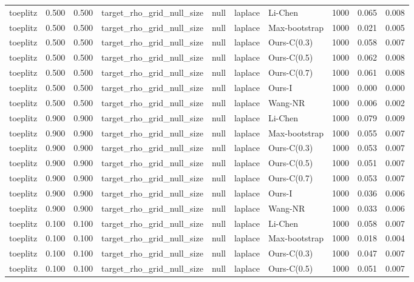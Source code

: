 \begin{tabular}{lrrllllrrr}
toeplitz & 0.500 & 0.500 & target\_rho\_grid\_null\_size & null & laplace & Li-Chen & 1000 & 0.065 & 0.008 \\
toeplitz & 0.500 & 0.500 & target\_rho\_grid\_null\_size & null & laplace & Max-bootstrap & 1000 & 0.021 & 0.005 \\
toeplitz & 0.500 & 0.500 & target\_rho\_grid\_null\_size & null & laplace & Ours-C(0.3) & 1000 & 0.058 & 0.007 \\
toeplitz & 0.500 & 0.500 & target\_rho\_grid\_null\_size & null & laplace & Ours-C(0.5) & 1000 & 0.062 & 0.008 \\
toeplitz & 0.500 & 0.500 & target\_rho\_grid\_null\_size & null & laplace & Ours-C(0.7) & 1000 & 0.061 & 0.008 \\
toeplitz & 0.500 & 0.500 & target\_rho\_grid\_null\_size & null & laplace & Ours-I & 1000 & 0.000 & 0.000 \\
toeplitz & 0.500 & 0.500 & target\_rho\_grid\_null\_size & null & laplace & Wang-NR & 1000 & 0.006 & 0.002 \\
toeplitz & 0.900 & 0.900 & target\_rho\_grid\_null\_size & null & laplace & Li-Chen & 1000 & 0.079 & 0.009 \\
toeplitz & 0.900 & 0.900 & target\_rho\_grid\_null\_size & null & laplace & Max-bootstrap & 1000 & 0.055 & 0.007 \\
toeplitz & 0.900 & 0.900 & target\_rho\_grid\_null\_size & null & laplace & Ours-C(0.3) & 1000 & 0.053 & 0.007 \\
toeplitz & 0.900 & 0.900 & target\_rho\_grid\_null\_size & null & laplace & Ours-C(0.5) & 1000 & 0.051 & 0.007 \\
toeplitz & 0.900 & 0.900 & target\_rho\_grid\_null\_size & null & laplace & Ours-C(0.7) & 1000 & 0.053 & 0.007 \\
toeplitz & 0.900 & 0.900 & target\_rho\_grid\_null\_size & null & laplace & Ours-I & 1000 & 0.036 & 0.006 \\
toeplitz & 0.900 & 0.900 & target\_rho\_grid\_null\_size & null & laplace & Wang-NR & 1000 & 0.033 & 0.006 \\
toeplitz & 0.100 & 0.100 & target\_rho\_grid\_null\_size & null & laplace & Li-Chen & 1000 & 0.058 & 0.007 \\
toeplitz & 0.100 & 0.100 & target\_rho\_grid\_null\_size & null & laplace & Max-bootstrap & 1000 & 0.018 & 0.004 \\
toeplitz & 0.100 & 0.100 & target\_rho\_grid\_null\_size & null & laplace & Ours-C(0.3) & 1000 & 0.047 & 0.007 \\
toeplitz & 0.100 & 0.100 & target\_rho\_grid\_null\_size & null & laplace & Ours-C(0.5) & 1000 & 0.051 & 0.007 \\

\end{tabular}
